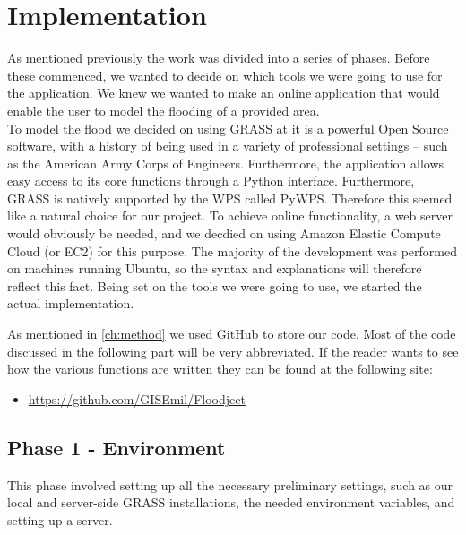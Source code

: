 
\chapter{Implementation} %

\label{ch:implementation} %


As mentioned previously the work was divided into a series of phases. Before these commenced, we wanted to decide on which tools we were going to use for the application. 
We knew we wanted to make an online application that would enable the user to model the flooding of a provided area.\\

To model the flood we decided on using GRASS at it is a powerful Open Source software, with a history of being used in a variety of professional settings – such as the American Army Corps of Engineers. Furthermore, the application allows easy access to its core functions through a Python interface. 
Furthermore, GRASS is natively supported by the WPS called PyWPS. Therefore this seemed like a natural choice for our project. 
To achieve online functionality, a web server would obviously be needed, and we decdied on using Amazon Elastic Compute Cloud (or EC2) for this purpose.
The majority of the development was performed on machines running Ubuntu, so the syntax and explanations will therefore reflect this fact.
Being set on the tools we were going to use, we started the actual implementation.

As mentioned in \autoref{ch:method} we used GitHub to store our code. Most of the code discussed in the following part will be very abbreviated. If the reader wants to see how the various functions are written they can be found at the following site: 

\begin{itemize}
\item \url{https://github.com/GISEmil/Floodject}
\end{itemize}

\section{Phase 1 - Environment}
This phase involved setting up all the necessary preliminary settings, such as our local and server-side GRASS installations, the needed environment variables, and setting up a server. \\

